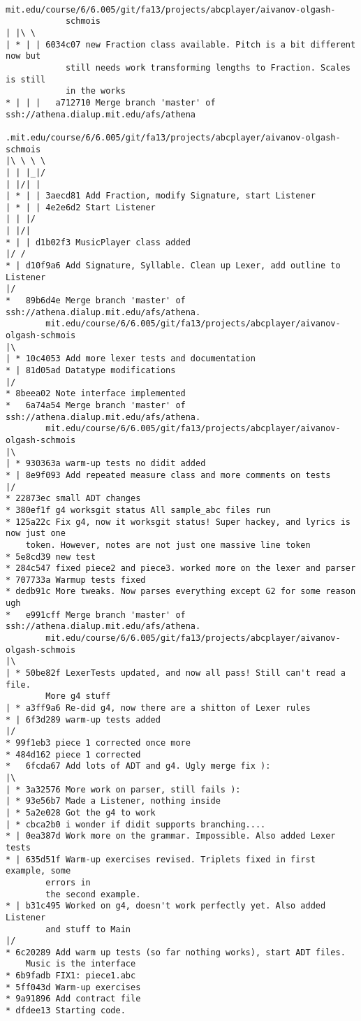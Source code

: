 \documentclass[12pt]{book}
\begin{document}
\begin{verbatim}
			mit.edu/course/6/6.005/git/fa13/projects/abcplayer/aivanov-olgash-
			schmois
| |\ \
| * | | 6034c07 new Fraction class available. Pitch is a bit different now but 
			still needs work transforming lengths to Fraction. Scales is still 
			in the works
* | | |   a712710 Merge branch 'master' of ssh://athena.dialup.mit.edu/afs/athena
			.mit.edu/course/6/6.005/git/fa13/projects/abcplayer/aivanov-olgash-schmois
|\ \ \ \
| | |_|/
| |/| |
| * | | 3aecd81 Add Fraction, modify Signature, start Listener
| * | | 4e2e6d2 Start Listener
| | |/
| |/|
* | | d1b02f3 MusicPlayer class added
|/ /
* | d10f9a6 Add Signature, Syllable. Clean up Lexer, add outline to Listener
|/
*   89b6d4e Merge branch 'master' of ssh://athena.dialup.mit.edu/afs/athena.
		mit.edu/course/6/6.005/git/fa13/projects/abcplayer/aivanov-olgash-schmois
|\
| * 10c4053 Add more lexer tests and documentation
* | 81d05ad Datatype modifications
|/
* 8beea02 Note interface implemented
*   6a74a54 Merge branch 'master' of ssh://athena.dialup.mit.edu/afs/athena.
		mit.edu/course/6/6.005/git/fa13/projects/abcplayer/aivanov-olgash-schmois
|\
| * 930363a warm-up tests no didit added
* | 8e9f093 Add repeated measure class and more comments on tests
|/
* 22873ec small ADT changes
* 380ef1f g4 worksgit status All sample_abc files run
* 125a22c Fix g4, now it worksgit status! Super hackey, and lyrics is now just one 
	token. However, notes are not just one massive line token
* 5e8cd39 new test
* 284c547 fixed piece2 and piece3. worked more on the lexer and parser
* 707733a Warmup tests fixed
* dedb91c More tweaks. Now parses everything except G2 for some reason ugh
*   e991cff Merge branch 'master' of ssh://athena.dialup.mit.edu/afs/athena.
		mit.edu/course/6/6.005/git/fa13/projects/abcplayer/aivanov-olgash-schmois
|\
| * 50be82f LexerTests updated, and now all pass! Still can't read a file. 
		More g4 stuff
| * a3ff9a6 Re-did g4, now there are a shitton of Lexer rules
* | 6f3d289 warm-up tests added
|/
* 99f1eb3 piece 1 corrected once more
* 484d162 piece 1 corrected
*   6fcda67 Add lots of ADT and g4. Ugly merge fix ):
|\
| * 3a32576 More work on parser, still fails ):
| * 93e56b7 Made a Listener, nothing inside
| * 5a2e028 Got the g4 to work
| * cbca2b0 i wonder if didit supports branching....
* | 0ea387d Work more on the grammar. Impossible. Also added Lexer tests
* | 635d51f Warm-up exercises revised. Triplets fixed in first example, some 
		errors in 
		the second example.
* | b31c495 Worked on g4, doesn't work perfectly yet. Also added Listener 
		and stuff to Main
|/
* 6c20289 Add warm up tests (so far nothing works), start ADT files. 
	Music is the interface
* 6b9fadb FIX1: piece1.abc
* 5ff043d Warm-up exercises
* 9a91896 Add contract file
* dfdee13 Starting code.

\end{verbatim}






\bigskip


      
      
\end{document}
